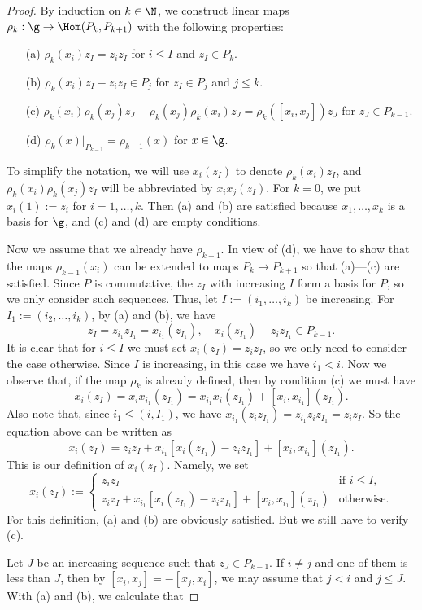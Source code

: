 \begin{proof}
By induction on $k\in\N$, we construct linear maps $\rho_k:\g\to\Hom(P_k,P_{k+1})$ with the following properties:
\begin{itemize}
\item[(a)] $\rho_k(x_i)z_I=z_iz_I$ for $i\leq I$ and $z_I\in P_k$.
\item[(b)] $\rho_k(x_i)z_I-z_iz_I\in P_j$ for $z_I\in P_j$ and $j\leq k$.
\item[(c)] $\rho_k(x_i)\rho_k(x_j)z_J-\rho_k(x_j)\rho_k(x_i)z_J=\rho_k([x_i,x_j])z_J$ for $z_J\in P_{k-1}$.
\item[(d)] $\rho_k(x)|_{P_{k-1}}=\rho_{k-1}(x)$ for $x\in\g$.
\end{itemize}
To simplify the notation, we will use $x_i(z_I)$ to denote $\rho_k(x_i)z_I$, and $\rho_k(x_i)\rho_k(x_j)z_I$ will be abbreviated by $x_ix_j(z_I)$. For $k=0$, we put $x_i(1):=z_i$ for $i=1,\dots,k$. Then (a) and (b) are satisfied because $x_1,\dots,x_k$ is a basis for $\g$, and (c) and (d) are empty conditions.\par
Now we assume that we already have $\rho_{k-1}$. In view of (d), we have to show that the maps $\rho_{k-1}(x_i)$ can be extended to maps $P_k\to P_{k+1}$ so that (a)---(c) are satisfied. Since $P$ is commutative, the $z_I$ with increasing $I$ form a basis for $P$, so we only consider such sequences. Thus, let $I:=(i_1,\dots,i_k)$ be increasing. For $I_1:=(i_2,\dots,i_k)$, by (a) and (b), we have
\[z_I=z_{i_1}z_{I_1}=x_{i_1}(z_{I_1}),\quad x_i(z_{I_1})-z_iz_{I_1}\in P_{k-1}.\]
It is clear that for $i\leq I$ we must set $x_i(z_I)=z_iz_I$, so we only need to consider the case otherwise. Since $I$ is increasing, in this case we have $i_1<i$. Now we observe that, if the map $\rho_k$ is already defined, then by condition (c) we must have
\[x_i(z_I)=x_ix_{i_1}(z_{I_1})=x_{i_1}x_i(z_{I_1})+[x_i,x_{i_1}](z_{I_1}).\]
Also note that, since $i_1\leq(i,I_1)$, we have $x_{i_1}(z_iz_{I_1})=z_{i_1}z_iz_{I_1}=z_iz_I$. So the equation above can be written as
\[x_i(z_I)=z_iz_I+x_{i_1}[x_i(z_{I_1})-z_iz_{I_1}]+[x_i,x_{i_1}](z_{I_1}).\]
This is our definition of $x_i(z_I)$. Namely, we set
\[x_i(z_I):=\begin{cases}
z_iz_I&\text{if }i\leq I,\\
z_iz_I+x_{i_1}[x_i(z_{I_1})-z_iz_{I_1}]+[x_i,x_{i_1}](z_{I_1})&\text{otherwise}.
\end{cases}\]
For this definition, (a) and (b) are obviously satisfied. But we still have to verify (c).\par
Let $J$ be an increasing sequence such that $z_J\in P_{k-1}$. If $i\neq j$ and one of them is less than $J$, then by $[x_i,x_j]=-[x_j,x_i]$, we may assume that $j<i$ and $j\leq J$. With (a) and (b), we calculate that

\end{proof}
